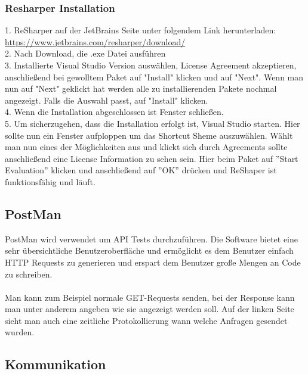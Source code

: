 \subsubsection{Resharper Installation}
\label{sec:ResharperInstallation}
1. ReSharper auf der JetBrains Seite unter folgendem Link herunterladen: \break \url {https://www.jetbrains.com/resharper/download/} \\
2. Nach Download, die .exe Datei ausführen \\
3. Installierte Visual Studio Version auswählen, License Agreement akzeptieren, anschließend bei gewolltem Paket auf "Install" klicken und auf "Next". 
Wenn man nun auf "Next" geklickt hat werden alle zu installierenden Pakete nochmal angezeigt. Falls die Auswahl passt, auf "Install" klicken. \\
4. Wenn die Installation abgeschlossen ist Fenster schließen. \\
5. Um sicherzugehen, dass die Installation erfolgt ist, Visual Studio starten. Hier sollte nun ein Fenster aufploppen um das Shortcut Sheme auszuwählen.
Wählt man nun eines der Möglichkeiten aus und klickt sich durch Agreements sollte anschließend eine License Information zu sehen sein. Hier beim Paket auf ''Start Evaluation'' klicken und anschließend auf ''OK'' drücken und ReShaper ist funktionsfähig und läuft.
\subsection {PostMan}
\label{sec:PostMan}
PostMan wird verwendet um API Tests durchzuführen. Die Software bietet eine sehr übersichtliche Benutzeroberfläche und ermöglicht es dem Benutzer einfach HTTP Requests zu generieren und erspart dem Benutzer große Mengen an Code zu schreiben. \\
\textcite{TechnologiePostman} \\ \break
Man kann zum Beispiel normale GET-Requests senden, bei der Response kann man unter anderem angeben wie sie angezeigt werden soll. Auf der linken Seite sieht man auch eine zeitliche Protokollierung wann welche Anfragen gesendet wurden.
\subsection{Kommunikation}
\label{sec:Kommunikation}
